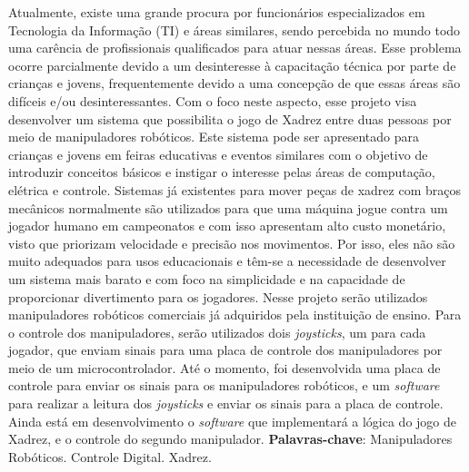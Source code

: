 

\setlength{\absparsep}{18pt} %
\begin{resumo}
  Atualmente, existe uma grande procura por funcionários especializados em Tecnologia da Informação (TI) e áreas similares, sendo percebida no mundo todo uma carência de profissionais qualificados para atuar nessas áreas.
  Esse problema ocorre parcialmente devido a um desinteresse à capacitação técnica por parte de crianças e jovens, frequentemente devido a uma concepção de que essas áreas são difíceis e/ou desinteressantes.
  Com o foco neste aspecto, esse projeto visa desenvolver um sistema que possibilita o jogo de Xadrez entre duas pessoas por meio de manipuladores robóticos.
  Este sistema pode ser apresentado para crianças e jovens em feiras educativas e eventos similares com o objetivo de introduzir conceitos básicos e instigar o interesse pelas áreas de computação, elétrica e controle.
  Sistemas já existentes para mover peças de xadrez com braços mecânicos normalmente são utilizados para que uma máquina jogue contra um jogador humano em campeonatos e com isso apresentam alto custo monetário, visto que priorizam velocidade e precisão nos movimentos.
  Por isso, eles não são muito adequados para usos educacionais e têm-se a necessidade de desenvolver um sistema mais barato e com foco na simplicidade e na capacidade de proporcionar divertimento para os jogadores.
  Nesse projeto serão utilizados manipuladores robóticos comerciais já adquiridos pela instituição de ensino.
  Para o controle dos manipuladores, serão utilizados dois \textit{joysticks}, um para cada jogador, que enviam sinais para uma placa de controle dos manipuladores por meio de um microcontrolador.
  Até o momento, foi desenvolvida uma placa de controle para enviar os sinais para os manipuladores robóticos, e um \textit{software} para realizar a leitura dos \textit{joysticks} e enviar os sinais para a placa de controle.
  Ainda está em desenvolvimento o \textit{software} que implementará a lógica do jogo de Xadrez, e o controle do segundo manipulador.
 \textbf{Palavras-chave}: Manipuladores Robóticos. Controle Digital. Xadrez.
\end{resumo}

